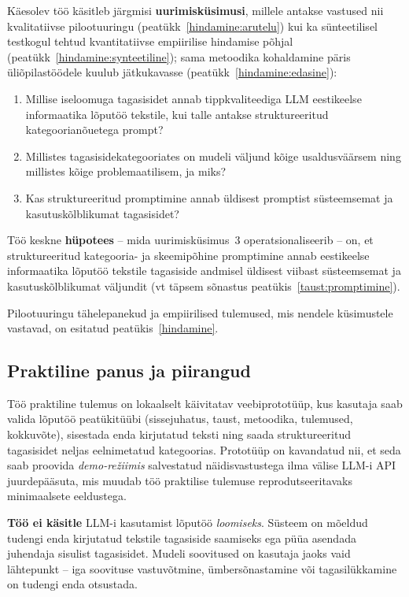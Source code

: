 Käesolev töö käsitleb järgmisi \textbf{uurimisküsimusi}, millele antakse vastused nii kvalitatiivse pilootuuringu (peatükk~\ref{hindamine:arutelu}) kui ka sünteetilisel testkogul tehtud kvantitatiivse empiirilise hindamise põhjal (peatükk~\ref{hindamine:synteetiline}); sama metoodika kohaldamine päris üliõpilastöödele kuulub jätkukavasse (peatükk~\ref{hindamine:edasine}):
\begin{enumerate}
    \item Millise iseloomuga tagasisidet annab tippkvaliteediga LLM eestikeelse informaatika lõputöö tekstile, kui talle antakse struktureeritud kategoorianõuetega prompt?
    \item Millistes tagasisidekategooriates on mudeli väljund kõige usaldusväärsem ning millistes kõige problemaatilisem, ja miks?
    \item Kas struktureeritud promptimine annab üldisest promptist süsteemsemat ja kasutuskõlblikumat tagasisidet?
\end{enumerate}

Töö keskne \textbf{hüpotees} -- mida uurimisküsimus~3 operatsionaliseerib -- on, et struktureeritud kategooria- ja skeemipõhine promptimine annab eestikeelse informaatika lõputöö tekstile tagasiside andmisel üldisest viibast süsteemsemat ja kasutuskõlblikumat väljundit (vt täpsem sõnastus peatükis~\ref{taust:promptimine}).

Pilootuuringu tähelepanekud ja empiirilised tulemused, mis nendele küsimustele vastavad, on esitatud peatükis~\ref{hindamine}.

\subsection*{Praktiline panus ja piirangud}

Töö praktiline tulemus on lokaalselt käivitatav veebiprototüüp, kus kasutaja saab valida lõputöö peatükitüübi (sissejuhatus, taust, metoodika, tulemused, kokkuvõte), sisestada enda kirjutatud teksti ning saada struktureeritud tagasisidet neljas eelnimetatud kategoorias. Prototüüp on kavandatud nii, et seda saab proovida \emph{demo-režiimis} salvestatud näidisvastustega ilma välise LLM-i API juurdepääsuta, mis muudab töö praktilise tulemuse reprodutseeritavaks minimaalsete eeldustega.

\textbf{Töö ei käsitle} LLM-i kasutamist lõputöö \emph{loomiseks}. Süsteem on mõeldud tudengi enda kirjutatud tekstile tagasiside saamiseks ega püüa asendada juhendaja sisulist tagasisidet. Mudeli soovitused on kasutaja jaoks vaid lähtepunkt -- iga soovituse vastuvõtmine, ümbersõnastamine või tagasilükkamine on tudengi enda otsustada.

